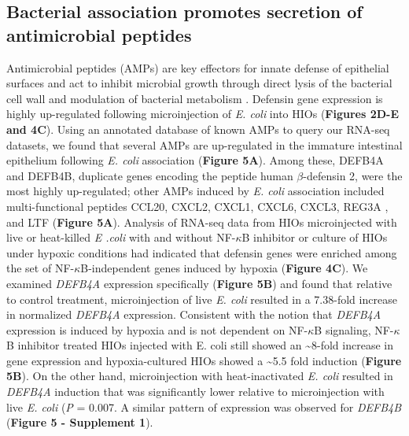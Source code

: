 \documentclass[9pt,lineo]{elife}
\begin{document}
\subsection*{{\bfseries\sffamily } Bacterial association promotes secretion of antimicrobial peptides}
\label{sec:orgheadline7}
Antimicrobial peptides (AMPs) are key effectors for innate defense of epithelial surfaces \citep{Muniz:2012} and act to inhibit microbial growth through direct lysis of the bacterial cell wall and modulation of bacterial metabolism  \citep{Ganz:2003,Bevins:2011,O'Neil:2003,Vora:2004,Brogden:2005}. Defensin gene expression is highly up-regulated following microinjection of \emph{E. coli} into HIOs (\textbf{Figures 2D-E and 4C}). Using an annotated database of known AMPs \citep{Wang:2016} to query our RNA-seq datasets, we found that several AMPs are up-regulated in the immature intestinal epithelium following \emph{E. coli} association (\textbf{Figure 5A}). Among these, DEFB4A and DEFB4B, duplicate genes encoding the peptide human \(\beta\)-defensin 2, were the most highly up-regulated; other AMPs induced by \emph{E. coli} association included multi-functional peptides CCL20, CXCL2, CXCL1, CXCL6, CXCL3, REG3A \citep{Cash:2006}, and LTF (\textbf{Figure 5A}). Analysis of RNA-seq data from HIOs microinjected with live or heat-killed \emph{E .coli} with and without NF-\(\kappa\)B inhibitor or culture of HIOs under hypoxic conditions had indicated that defensin genes were enriched among the set of NF-\(\kappa\)B-independent genes induced by hypoxia (\textbf{Figure 4C}). We examined \emph{DEFB4A} expression specifically (\textbf{Figure 5B}) and found that relative to control treatment, microinjection of live \emph{E. coli} resulted in a 7.38-fold increase in normalized \emph{DEFB4A} expression. Consistent with the notion that \emph{DEFB4A} expression is induced by hypoxia and is not dependent on NF-\(\kappa\)B signaling, NF-\(\kappa\)B inhibitor treated HIOs injected with E. coli still showed an \textasciitilde{}8-fold increase in gene expression and hypoxia-cultured HIOs showed a \textasciitilde{}5.5 fold induction (\textbf{Figure 5B}). On the other hand, microinjection with heat-inactivated \emph{E. coli} resulted in \emph{DEFB4A} induction that was significantly lower relative to microinjection with live \emph{E. coli} (\emph{P} = 0.007. A similar pattern of expression was observed for \emph{DEFB4B} (\textbf{Figure 5 - Supplement 1}).
\end{document}

